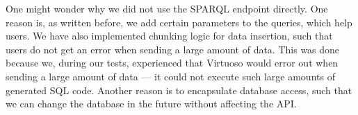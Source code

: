 One might wonder why we did not use the SPARQL endpoint directly. One reason is, as written before, we add certain parameters to the queries, which help users. We have also implemented chunking logic for data insertion, such that users do not get an error when sending a large amount of data. This was done because we, during our tests, experienced that Virtuoso would error out when sending a large amount of data --- it could not execute such large amounts of generated SQL code.
Another reason is to encapsulate database access, such that we can change the database in the future without affecting the API.
